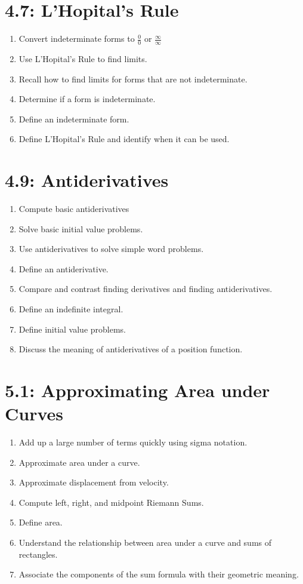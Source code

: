 \section*{4.7: L'Hopital's Rule}
\begin{enumerate}
	\item Convert indeterminate forms to $\frac{0}{0}$ or $\frac{\infty}{\infty}$
	\item Use L'Hopital's Rule to find limits.
	\item Recall how to find limits for forms that are not indeterminate.
	\item Determine if a form is indeterminate.
	\item Define an indeterminate form.
	\item Define L'Hopital's Rule and identify when it can be used.
\end{enumerate}

\section*{4.9: Antiderivatives}
\begin{enumerate}
	\item Compute basic antiderivatives
	\item Solve basic initial value problems.
	\item Use antiderivatives to solve simple word problems.
	\item Define an antiderivative.
	\item Compare and contrast finding derivatives and finding antiderivatives.
	\item Define an indefinite integral.
	\item Define initial value problems.
	\item Discuss the meaning of antiderivatives of a position function.
\end{enumerate}

\section*{5.1: Approximating Area under Curves}
\begin{enumerate}
	\item Add up a large number of terms quickly using sigma notation.
	\item Approximate area under a curve.
	\item Approximate displacement from velocity.
	\item Compute left, right, and midpoint Riemann Sums.
	\item Define area.
	\item Understand the relationship between area under a curve and sums of rectangles.
	\item Associate the components of the sum formula with their geometric meaning.
\end{enumerate}

